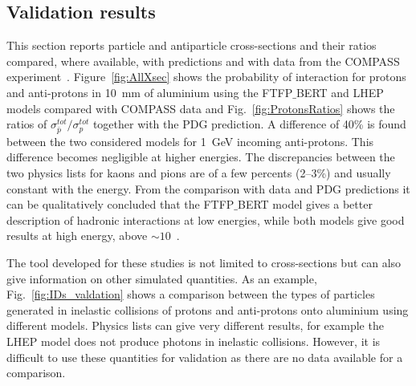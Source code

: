 \subsection{Validation results}

This section reports particle and antiparticle cross-sections and their ratios
compared, where available, with predictions and with data from the COMPASS experiment~\cite{Abbon:2007pq}.
%
Figure~\ref{fig:AllXsec} shows the probability of interaction for protons and anti-protons in 10~mm of aluminium
using the FTFP$\_$BERT and LHEP models compared with COMPASS data
and Fig.~\ref{fig:ProtonsRatios} shows the ratios of $\sigma^{tot}_{\bar{p}} / \sigma^{tot}_{p}$
together with the PDG prediction. 
%
A difference of 40\% is found between the two considered models for 1~GeV incoming anti-protons.
This difference becomes negligible at higher energies. The discrepancies between the two physics lists
for kaons and pions are of a few percents (2--3\%) and usually constant with the energy. From the comparison 
with data and PDG predictions it can be qualitatively concluded that the FTFP$\_$BERT model gives a better
description of hadronic interactions at low energies, while both models give good results at high energy, above $\sim10$~\gev.

The tool developed for these studies is not limited to cross-sections but can also give information on other simulated quantities.
As an example, Fig.~\ref{fig:IDs_valdation} shows a comparison between the types of particles generated in inelastic
collisions of protons and anti-protons onto aluminium using different models. Physics lists can give very different results, 
for example the LHEP model does not produce photons in inelastic collisions. However, it is difficult to use these
quantities for validation as there are no data available for a comparison.


